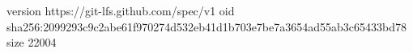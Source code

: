 version https://git-lfs.github.com/spec/v1
oid sha256:2099293c9c2abe61f970274d532eb41d1b703e7be7a3654ad55ab3c65433bd78
size 22004
